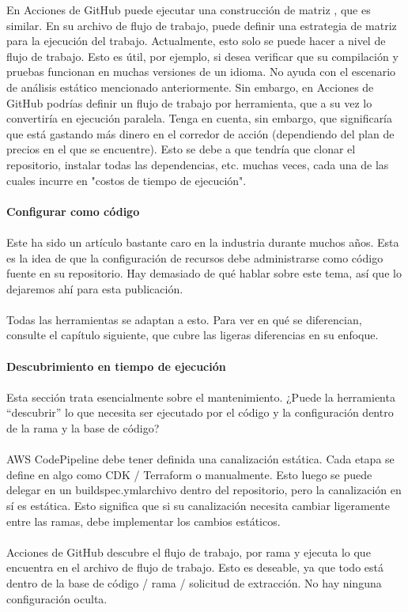 \documentclass[twoside,twocolumn]{article}
\begin{document}
En Acciones de GitHub puede ejecutar una construcción de matriz , que es similar. En su archivo de flujo de trabajo, puede definir una estrategia de matriz para la ejecución del trabajo. Actualmente, esto solo se puede hacer a nivel de flujo de trabajo. Esto es útil, por ejemplo, si desea verificar que su compilación y pruebas funcionan en muchas versiones de un idioma. No ayuda con el escenario de análisis estático mencionado anteriormente. Sin embargo, en Acciones de GitHub podrías definir un flujo de trabajo por herramienta, que a su vez lo convertiría en ejecución paralela. Tenga en cuenta, sin embargo, que significaría que está gastando más dinero en el corredor de acción (dependiendo del plan de precios en el que se encuentre). Esto se debe a que tendría que clonar el repositorio, instalar todas las dependencias, etc. muchas veces, cada una de las cuales incurre en "costos de tiempo de ejecución".
\\\\
\textbf{Configurar como código}
\\\\Este ha sido un artículo bastante caro en la industria durante muchos años. Esta es la idea de que la configuración de recursos debe administrarse como código fuente en su repositorio. Hay demasiado de qué hablar sobre este tema, así que lo dejaremos ahí para esta publicación.\\\\
Todas las herramientas se adaptan a esto. Para ver en qué se diferencian, consulte el capítulo siguiente, que cubre las ligeras diferencias en su enfoque.
\\\\
\textbf{Descubrimiento en tiempo de ejecución}
\\\\Esta sección trata esencialmente sobre el mantenimiento. ¿Puede la herramienta “descubrir” lo que necesita ser ejecutado por el código y la configuración dentro de la rama y la base de código?\\\\
AWS CodePipeline debe tener definida una canalización estática. Cada etapa se define en algo como CDK / Terraform o manualmente. Esto luego se puede delegar en un buildspec.ymlarchivo dentro del repositorio, pero la canalización en sí es estática. Esto significa que si su canalización necesita cambiar ligeramente entre las ramas, debe implementar los cambios estáticos.\\\\
Acciones de GitHub descubre el flujo de trabajo, por rama y ejecuta lo que encuentra en el archivo de flujo de trabajo. Esto es deseable, ya que todo está dentro de la base de código / rama / solicitud de extracción. No hay ninguna configuración oculta.
\end{document}
